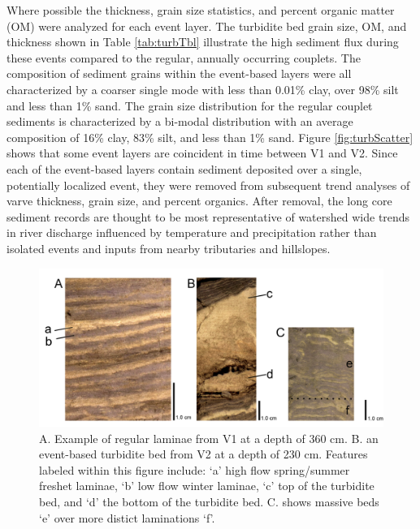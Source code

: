 \documentclass[Royal,times,doublespace,sageh]{sagej}
\begin{document}
Where possible the thickness, grain size statistics, and percent organic
matter (OM) were analyzed for each event layer. The turbidite bed grain
size, OM, and thickness shown in Table \ref{tab:turbTbl} illustrate the
high sediment flux during these events compared to the regular, annually
occurring couplets. The composition of sediment grains within the
event-based layers were all characterized by a coarser single mode with
less than 0.01\% clay, over 98\% silt and less than 1\% sand. The grain
size distribution for the regular couplet sediments is characterized by
a bi-modal distribution with an average composition of 16\% clay, 83\%
silt, and less than 1\% sand. Figure \ref{fig:turbScatter} shows that
some event layers are coincident in time between V1 and V2. Since each
of the event-based layers contain sediment deposited over a single,
potentially localized event, they were removed from subsequent trend
analyses of varve thickness, grain size, and percent organics. After
removal, the long core sediment records are thought to be most
representative of watershed wide trends in river discharge influenced by
temperature and precipitation rather than isolated events and inputs
from nearby tributaries and hillslopes.

\begin{figure}

{\centering \includegraphics[width=1\linewidth]{../figs/long_core/good_vs_flood_vs_disturbed_varves_} 

}

\caption{A. Example of regular laminae from V1 at a depth of 360 cm. B. an event-based turbidite bed from V2 at a depth of 230 cm. Features labeled within this figure include: ‘a’ high flow spring/summer freshet laminae, ‘b’ low flow winter laminae, ‘c’  top of the turbidite bed, and ‘d’ the bottom of the turbidite bed. C. shows massive beds ‘e’ over more distict laminations ‘f’.\label{tab:varve-turb}}\label{fig:varve-turb}
\end{figure}
\end{document}
